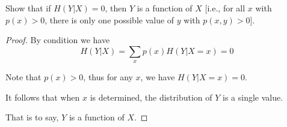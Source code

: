 \begin{exercise} {Show that if $H(Y|X) = 0$, then $Y$ is a function of $X$ [i.e., for all $x$ with $p(x) > 0$, there is only one possible value of $y$ with $p(x, y) > 0$].}

\begin{proof}
    By condition we have $$H(Y|X) = \sum_{x} p(x) H(Y|X=x) = 0$$
    
    Note that $p(x)>0$, thus for any $x$, we have $H(Y|X=x)=0$.

    It follows that when $x$ is determined, the distribution of $Y$ is a single value.
    
    That is to say, $Y$ is a function of $X$.
\end{proof}
\end{exercise}


